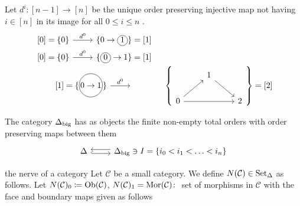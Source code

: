 Let $d^i\colon[n-1] \to [n]$ be the unique order preserving injective map not having $i \in [n]$ in its image for all $0 \leq i \leq n$ .
\[
\begin{tabular}{cc}
     \begin{tikzcd}
         \text{[}0]=\{0\}
         \arrow[r, "d^0"]
         &
         \{0 \to \circled{1}\}=[1]
     \end{tikzcd}
     \\
     \begin{tikzcd}
         \text{[}0]=\{0\}
         \arrow[r, "d^0"]
         &
         \{\circled{0} \to 1\}=[1]
     \end{tikzcd}
     \\
     \begin{tikzcd}
         \text{[}1]=\{ \encircled{0 \to 1}\}
         \arrow[r, "d^0"]
         &
         {}
     \end{tikzcd}
     &
     $\left\{
     \begin{tikzcd}
         &
         1
         \arrow[rd]
         &
         \\
         0
         \arrow[ru]
         \arrow[rr]
         &
         &
         2
     \end{tikzcd}
     \right\}=[2]$
\end{tabular}
\]


\begin{defi}
    The category $\Delta_{\operatorname{big}}$ has as objects the finite non-empty total orders with order preserving maps between them
    \[
    \begin{tabular}{c}
         \begin{tikzcd}
             \Delta
             \arrow[r, hook, shift right]
             &
             \Delta_{\txtbig} 
             \arrow[l, shift right] \ni I = \{ i_0 < i_1 < \dotsc < i_n \}
         \end{tikzcd}      
    \end{tabular}
    \]
\end{defi}


\begin{exmp}{the nerve of a category}
    Let $\mathcal{C}$ be a small category. 
    We define $N(\mathcal{C}) \in \operatorname{Set}_{\Delta}$ as follows. 
    Let $N(\mathcal{C})_0 \coloneqq \operatorname{Ob}(\mathcal{C})$, $N(\mathcal{C})_1=\operatorname{Mor}(\mathcal{C})\colon$ set of morphisms in $\mathcal{C}$ with the face and boundary maps given as follows
    
\end{exmp}

